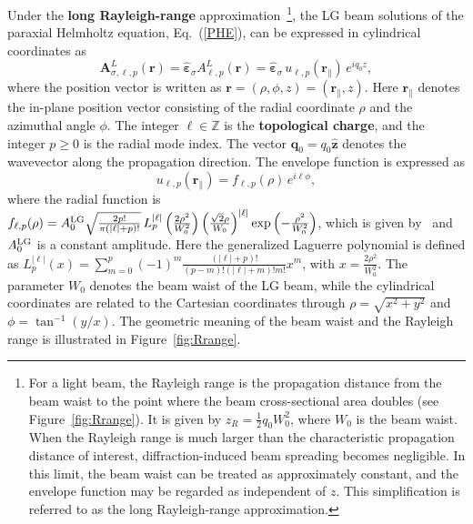 Under the \textbf{long Rayleigh-range} approximation~\cite{romero2002quantum}\footnote{For a light beam, the Rayleigh range is the propagation distance from the beam waist to the point where the beam cross-sectional area doubles (see Figure~\ref{fig:Rrange}). It is given by $z_R=\frac{1}{2}q_0W_0^2$, where $W_0$ is the beam waist. When the Rayleigh range is much larger than the characteristic propagation distance of interest, diffraction-induced beam spreading becomes negligible. In this limit, the beam waist can be treated as approximately constant, and the envelope function may be regarded as independent of $z$. This simplification is referred to as the long Rayleigh-range approximation.}, the LG beam solutions of the paraxial Helmholtz equation, Eq.~(\ref{PHE}), can be expressed in cylindrical coordinates as
\begin{equation}
\boldsymbol{A}^{L}_{\sigma, \ell, p}(\boldsymbol{r})
=
\hat{\boldsymbol{\varepsilon}}_\sigma  A^{L}_{\ell, p}(\boldsymbol{r})
=
\hat{\boldsymbol{\varepsilon}}_\sigma 
\, u_{\ell, p}(\boldsymbol{r}_\parallel)
\, e^{i q_0 z},
\label{LGbeam}
\end{equation}
where the position vector is written as $\boldsymbol{r}=(\rho,\phi,z)=(\boldsymbol{r}_\parallel,z)$. Here $\boldsymbol{r}_\parallel$ denotes the in-plane position vector consisting of the radial coordinate $\rho$ and the azimuthal angle $\phi$. The integer $\ell\in\mathbb{Z}$ is the \textbf{topological charge}, and the integer $p\ge0$ is the radial mode index. The vector $\boldsymbol{q}_0 = q_0 \hat{\boldsymbol{z}}$ denotes the wavevector along the propagation direction. The envelope function is expressed as
\begin{equation}
u_{\ell, p}(\boldsymbol{r}_\parallel)=f_{\ell, p}(\rho)\,e^{i\ell\phi},
\end{equation}
where the radial function is $f_{\ell, p}(\rho)
=
A^{\rm LG}_0\sqrt{\frac{2p!}{\pi(|\ell|+p)!}}
\,
L_p^{|\ell|}
\left(
\frac{2\rho^2}{W_0^2}
\right)
\left(
\frac{\sqrt{2}\rho}{W_0}
\right)^{|\ell|}
\exp\left(
-\frac{\rho^2}{W_0^2}
\right)$, which is given by~\cite{romero2002quantum, peng2022tailoring, sanchez2024enhanced} and $A^{\rm LG}_0$ is a constant amplitude. Here the generalized Laguerre polynomial is defined as $L_p^{|\ell|}(x)
=
\sum_{m=0}^{p}
(-1)^m
\frac{(|\ell|+p)!}{(p-m)!(|\ell|+m)!m!}
x^m$, with $x=\frac{2\rho^2}{W_0^2}$. The parameter $W_0$ denotes the beam waist of the LG beam, while the cylindrical coordinates are related to the Cartesian coordinates through $\rho=\sqrt{x^2+y^2}$ and $\phi=\tan^{-1}(y/x)$. The geometric meaning of the beam waist and the Rayleigh range is illustrated in Figure~\ref{fig:Rrange}.

